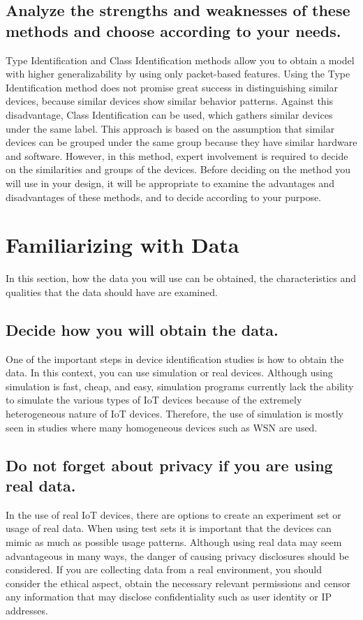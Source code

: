 \documentclass[journal]{IEEEtran}
\begin{document}
\subsection{Analyze the strengths and weaknesses of these methods and choose according to your needs.}
Type Identification and Class Identification methods allow you to obtain a model with higher generalizability by using only packet-based features. Using the Type Identification method does not promise great success in distinguishing similar devices, because similar devices show similar behavior patterns. Against this disadvantage, Class Identification can be used, which gathers similar devices under the same label. This approach is based on the assumption that similar devices can be grouped under the same group because they have similar hardware and software. However, in this method, expert involvement is required to decide on the similarities and groups of the devices. Before deciding on the method you will use in your design, it will be appropriate to examine the advantages and disadvantages of these methods, and to decide according to your purpose.

\section{Familiarizing with Data}\label{section:data}
In this section, how the data you will use can be obtained, the characteristics and qualities that the data should have are examined.

\subsection{Decide how you will obtain the data.}

One of the important steps in device identification studies is how to obtain the data. In this context, you can use simulation or real devices. Although using simulation is fast, cheap, and easy, simulation programs currently lack the ability to simulate the various types of IoT devices because of the extremely heterogeneous nature of IoT devices. Therefore, the use of simulation is mostly seen in studies where many homogeneous devices such as WSN are used.


\subsection{Do not forget about privacy if you are using real data.}
In the use of real IoT devices, there are options to create an experiment set or usage of real data. When using test sets it is important that the devices can mimic as much as possible  usage patterns. Although using real data may seem advantageous in many ways, the danger of causing privacy disclosures should be considered. If you are collecting data from a real environment, you should consider the ethical aspect, obtain the necessary relevant permissions and censor any information that may disclose confidentiality such as user identity or IP addresses.
\end{document}

